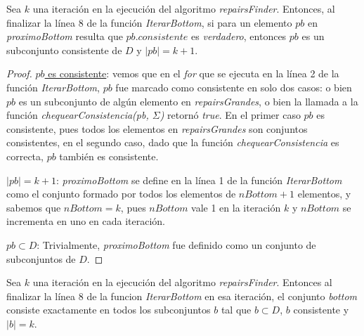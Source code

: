 \documentclass[11pt,a4paper,twoside]{tesis}
\begin{document}
\begin{lemma}\label{finalizar_iteracion_8_proximo_bottom}
Sea $k$ una iteración en la ejecución del algoritmo \textit{repairsFinder}. Entonces, al finalizar la línea 8 de la función \textit{IterarBottom}, si para un elemento $pb$ en \textit{proximoBottom} resulta que $pb.consistente$ es \textit{verdadero}, entonces $pb$ es un subconjunto consistente de $D$ y $|pb| = k +1$.
\end{lemma}

\begin{proof}
\underline{$pb$ es consistente}: vemos que en el \textit{for} que se ejecuta en la línea 2 de la función \textit{IterarBottom}, $pb$ fue marcado como consistente en solo dos casos: o bien $pb$ es un subconjunto de algún elemento en \textit{repairsGrandes}, o bien la llamada a la función \textit{chequearConsistencia(pb, $\Sigma$)} retornó \textit{true}. En el primer caso $pb$ es consistente, pues todos los elementos en \textit{repairsGrandes} son conjuntos consistentes, en el segundo caso, dado que la función \textit{chequearConsistencia} es correcta, $pb$ también es consistente.

\underline{$|pb| = k + 1$}: \textit{proximoBottom} se define en la línea 1 de la función \textit{IterarBottom} como el conjunto formado por todos los elementos de $nBottom + 1$ elementos, y sabemos que $nBottom = k$, pues $nBottom$ vale 1 en la iteración $k$ y $nBottom$ se incrementa en uno en cada iteración.

\underline{$pb \subset D$}: Trivialmente, \textit{proximoBottom} fue definido como un conjunto de subconjuntos de $D$.
\end{proof}



\begin{lemma}\label{lemma_bottom}
Sea $k$ una iteración en la ejecución del algoritmo \textit{repairsFinder}. Entonces al finalizar la línea 8 de la funcion \textit{IterarBottom} en esa iteración, el conjunto  \textit{bottom} consiste exactamente en todos los subconjuntos $b$ tal que $b \subset D$, $b$ consistente y $|b| = k$.
\end{lemma}
\end{document}
